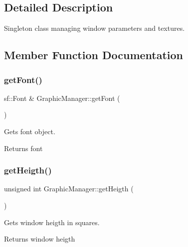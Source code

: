 \subsection{Detailed Description}
Singleton class managing window parameters and textures. 

\subsection{Member Function Documentation}
\mbox{\label{class_graphic_manager_ab11f88514adc3dbe6912438c0280b267}} 
\subsubsection{\texorpdfstring{get\+Font()}{getFont()}}
{\footnotesize\ttfamily sf\+::\+Font \& Graphic\+Manager\+::get\+Font (\begin{DoxyParamCaption}{ }\end{DoxyParamCaption})}



Gets font object. 

\begin{DoxyReturn}{Returns}
font 
\end{DoxyReturn}
\mbox{\label{class_graphic_manager_a6e55c77b8bd70d820920090db8ad666b}} 
\subsubsection{\texorpdfstring{get\+Heigth()}{getHeigth()}}
{\footnotesize\ttfamily unsigned int Graphic\+Manager\+::get\+Heigth (\begin{DoxyParamCaption}{ }\end{DoxyParamCaption})}



Gets window heigth in squares. 

\begin{DoxyReturn}{Returns}
window heigth 
\end{DoxyReturn}
\mbox{\label{class_graphic_manager_a5ab0713b781b88adb5906db47b5a1d45}} 
